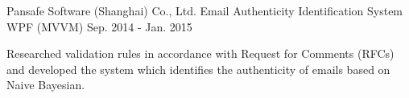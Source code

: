 \begin{cventries}
  \cventry
    {Pansafe Software (Shanghai) Co., Ltd.}
    {Email Authenticity Identification System}
    {WPF (MVVM)}
    {Sep. 2014 - Jan. 2015}
    {
      \begin{cvitems}
        \item {Researched validation rules in accordance with Request for Comments (RFCs) and developed the system which identifies the authenticity of emails based on Naive Bayesian.}
      \end{cvitems}
    }
\end{cventries}
